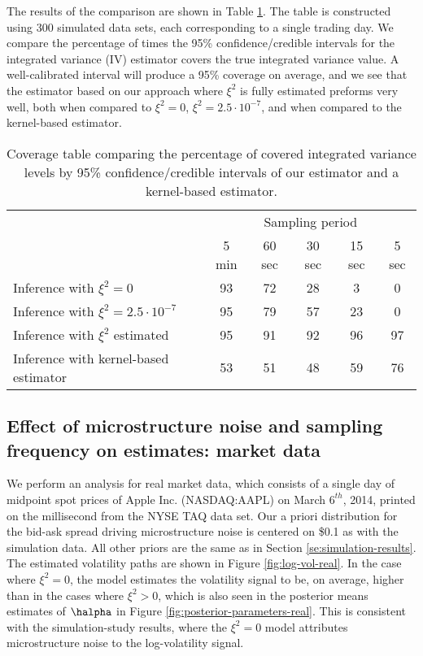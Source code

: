 The results of the comparison are shown in Table \ref{ta:coverage}. The table is constructed using 300 simulated data sets, each corresponding to a single trading day. We compare the percentage of times the 95\% confidence/credible intervals for the integrated variance (IV) estimator covers the true integrated variance value.  A well-calibrated interval will produce a 95\% coverage on average, and we see that the estimator based on our approach where $\xi^2$ is fully estimated preforms very well, both when compared to $\xi^2 =0$, $\xi^2 = 2.5 \cdot 10^{-7}$, and when compared to the kernel-based estimator.

\begin{table}[h]
\begin{center}
  \begin{tabular}{|l|ccccc|}
    \hline
    & \multicolumn{5}{c|}{Sampling period} \\
    &   5 min  &	60 sec 	&   30 sec   &   15 sec & 5 sec  \\ \hline \hline
    Inference with $\xi^2 = 0$  &  93  &  72  &   28  &	 3 & 0 \\
    Inference with $\xi^2 = 2.5 \cdot 10^{-7}$ & 95 & 79 & 57 & 23 & 0 \\
    Inference with $\xi^2$ estimated & 95 & 91 & 92 & 96 & 97  \\ \hline
    Inference with kernel-based estimator &  53 & 51 & 48 & 59  & 76 \\
    \hline
\end{tabular}
\caption{Coverage table comparing the percentage of covered integrated variance levels by 95\% confidence/credible intervals of our estimator and a kernel-based estimator.}\label{ta:coverage}
\end{center}
\end{table}

\subsection{Effect of microstructure noise and sampling frequency on estimates: market data }

We perform an analysis for real market data, which consists of a single day of midpoint spot prices of Apple Inc. (NASDAQ:AAPL) on March $6^{th}$, 2014, printed on the millisecond from the NYSE TAQ data set.  Our a priori distribution for the bid-ask spread driving microstructure noise is centered on \$0.1 as with the simulation data. All other priors are the same as in Section \ref{se:simulation-results}.  The estimated volatility paths are shown in Figure \ref{fig:log-vol-real}.  In the case where $\xi^2 = 0$, the model estimates the volatility signal to be, on average, higher than in the cases where $\xi^2 > 0$, which is also seen in the posterior means estimates of $\halpha$ in Figure \ref{fig:posterior-parameters-real}. This is consistent with the simulation-study results, where the $\xi^2 = 0$ model attributes microstructure noise to the log-volatility signal.


